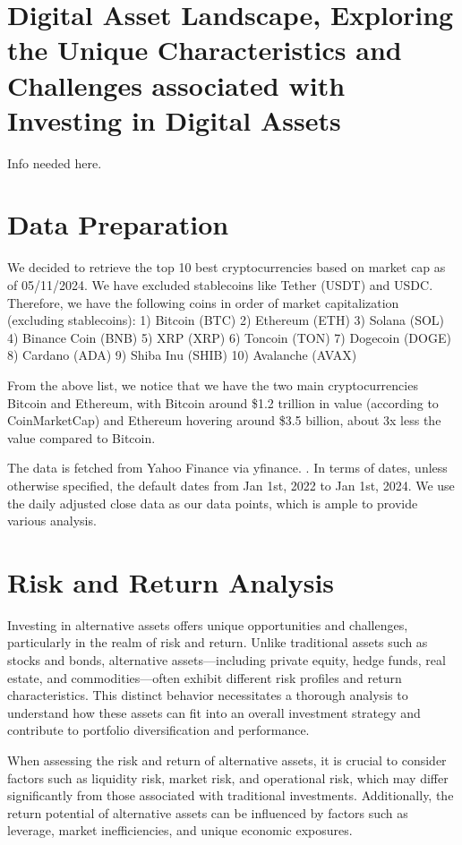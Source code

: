 \documentclass{ledger}
\begin{document}
\section{Digital Asset Landscape, Exploring the Unique Characteristics and Challenges associated with Investing in Digital Assets}

Info needed here.

\section{Data Preparation}

We decided to retrieve the top 10 best cryptocurrencies based on market cap as of 05/11/2024. We have excluded stablecoins like Tether (USDT) and USDC. Therefore, we have the following coins in order of market capitalization (excluding stablecoins): 
1) Bitcoin (BTC)
2) Ethereum (ETH)
3) Solana (SOL)
4) Binance Coin (BNB)
5) XRP (XRP)
6) Toncoin (TON)
7) Dogecoin (DOGE)
8) Cardano (ADA)
9) Shiba Inu (SHIB)
10) Avalanche (AVAX)

From the above list, we notice that we have the two main cryptocurrencies Bitcoin and Ethereum, with Bitcoin around \$1.2 trillion in value (according to CoinMarketCap) and Ethereum hovering around \$3.5 billion, about 3x less the value compared to Bitcoin.

The data is fetched from Yahoo Finance via yfinance. \cite{yfinance}. In terms of dates, unless otherwise specified, the default dates from Jan 1st, 2022 to Jan 1st, 2024. We use the daily adjusted close data as our data points, which is ample to provide various analysis.

\section{Risk and Return Analysis}

Investing in alternative assets offers unique opportunities and challenges, particularly in the realm of risk and return. Unlike traditional assets such as stocks and bonds, alternative assets—including private equity, hedge funds, real estate, and commodities—often exhibit different risk profiles and return characteristics. This distinct behavior necessitates a thorough analysis to understand how these assets can fit into an overall investment strategy and contribute to portfolio diversification and performance.

When assessing the risk and return of alternative assets, it is crucial to consider factors such as liquidity risk, market risk, and operational risk, which may differ significantly from those associated with traditional investments. Additionally, the return potential of alternative assets can be influenced by factors such as leverage, market inefficiencies, and unique economic exposures.
\end{document}
